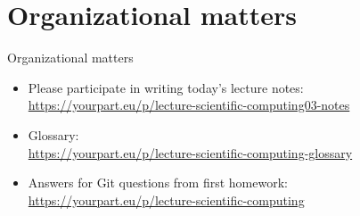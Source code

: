 
\subtitle{Start programming in Python}
\date{2020-04-02}


\begin{frame}
	\tableofcontents
\end{frame}

\section{Organizational matters}
\begin{frame}[fragile]{Organizational matters}
	\begin{itemize}
		\item Please participate in writing today's lecture notes:
            \href{https://yourpart.eu/p/lecture-scientific-computing03-notes}{https://yourpart.eu/p/lecture-scientific-computing03-notes}
        \item Glossary:\\
            \href{https://yourpart.eu/p/lecture-scientific-computing-glossary}{https://yourpart.eu/p/lecture-scientific-computing-glossary}
        \item Answers for Git questions from first homework:\\
            \href{https://yourpart.eu/p/lecture-scientific-computing}{https://yourpart.eu/p/lecture-scientific-computing}
	\end{itemize}
\end{frame}

